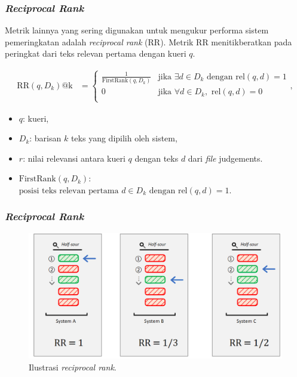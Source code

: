 \documentclass{beamer}
\newcommand{\f}[1]{\textit{#1}}
\begin{document}
\begin{frame}
    \frametitle{\f{Reciprocal Rank}}
    Metrik lainnya yang sering digunakan untuk mengukur performa sistem pemeringkatan adalah \f{reciprocal rank} (RR). Metrik RR menitikberatkan pada peringkat dari teks relevan pertama dengan kueri $q$.

        \begin{align*}
            \text{RR}(q, D_k)\text{@k} &= \begin{cases}
                \frac{1}{\text{FirstRank}(q, D_k)} & \text{jika } \exists d \in D_k \text{ dengan } \text{rel}(q, d) = 1 \\        
                0 & \text{jika } \forall d \in D_k, \text{ rel}(q, d) = 0 \\
                \end{cases},
        \end{align*}
        
        \begin{itemize}
            \item $q$: kueri,
            \item $D_k$: barisan $k$ teks yang dipilih oleh sistem,
            \item $r$: nilai relevansi antara kueri $q$ dengan teks $d$ dari \f{file} judgements.
            \item $ \text{FirstRank}(q,D_k)$: $\text{posisi teks relevan pertama } d\in D_k \text{ dengan } \text{rel}(q, d) = 1. $
        \end{itemize}
\end{frame}


\begin{frame}
    \frametitle{\f{Reciprocal Rank}}
    \begin{figure}[!ht]
        \centering
        \includegraphics[width=1\textwidth]{assets/pics/rr.png}
        \caption{Ilustrasi \f{reciprocal rank}.}
        \label{fig:reciprocal-rank}
    \end{figure}
\end{frame}
\end{document}
